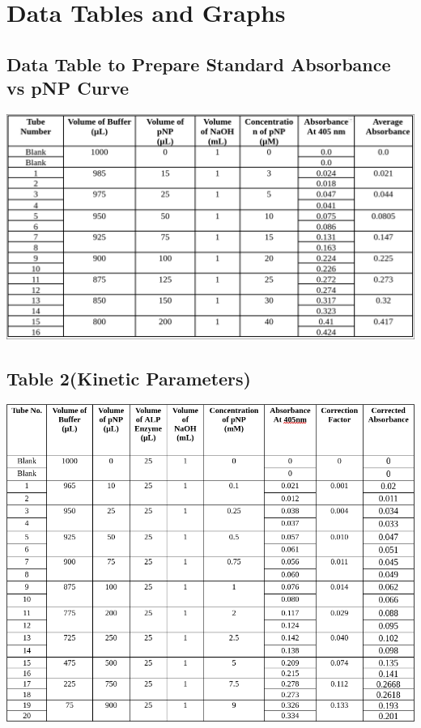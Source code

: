\documentclass[12pt]{article}
\theoremstyle{definition}
\theoremstyle{definition}
\theoremstyle{remark}
\begin{document}
\section{Data Tables and Graphs}
\subsection{Data Table to Prepare Standard Absorbance vs pNP Curve}
\begin{center}
    \includegraphics[width = 6.0in]{Pasted image 1.png}
\end{center}

\subsection{Table 2(Kinetic Parameters)}
\begin{center}
    \includegraphics[width = 6.0in]{Pasted image 2.png}
\end{center}
\end{document}
